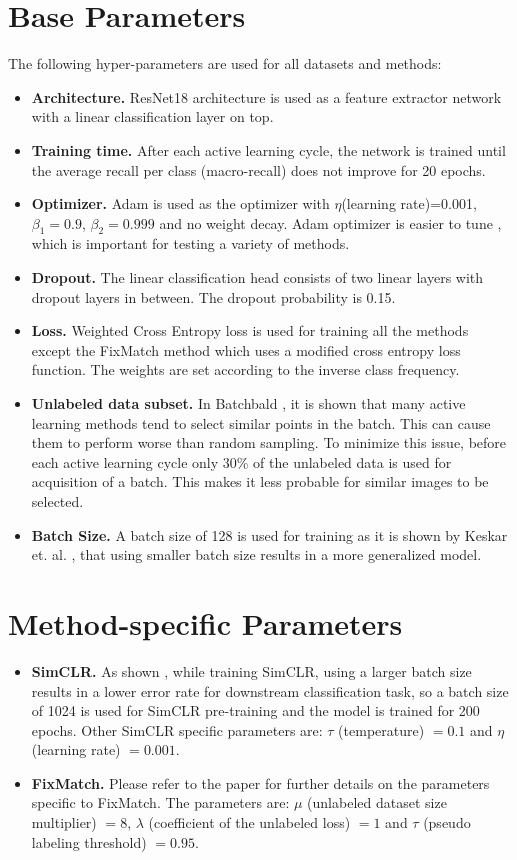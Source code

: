 \section{Base Parameters}\label{section:base_parameters}
The following hyper-parameters are used for all datasets and methods:
\begin{itemize}
  \item \textbf{Architecture.} ResNet18 \cite{he2016} architecture is used as a feature extractor network with a linear classification layer on top.
  \item \textbf{Training time.} After each active learning cycle, the network is trained until the average recall per class (macro-recall) does not improve for 20 epochs.
  \item \textbf{Optimizer.} Adam \cite{kingma2014} is used as the optimizer with $\eta$(learning rate)=0.001, $\beta_1=0.9$, $\beta_2=0.999$ and no weight decay. Adam optimizer is easier to tune \cite{schneider2019}, which is important for testing a variety of methods.
  \item \textbf{Dropout.} The linear classification head consists of two linear layers with dropout layers in between. The dropout probability is 0.15.
  \item \textbf{Loss.} Weighted Cross Entropy loss is used for training all the methods except the FixMatch method which uses a modified cross entropy loss function. The weights are set according to the inverse class frequency.
  \item \textbf{Unlabeled data subset.} In Batchbald \cite{kirsch2019}, it is shown that many active learning methods tend to select similar points in the batch. This can cause them to perform worse than random sampling. To minimize this issue, before each active learning cycle only 30\% of the unlabeled data is used for acquisition of a batch. This makes it less probable for similar images to be selected.
  \item \textbf{Batch Size.} A batch size of 128 is used for training as it is shown by Keskar et. al. \cite{keskar2016}, that using smaller batch size results in a more generalized model.
\end{itemize}
\section{Method-specific Parameters}\label{section:method_specific_parameters}
\begin{itemize}
  \item \textbf{SimCLR.} As shown \cite{chen2020}, while training SimCLR, using a larger batch size results in a lower error rate for downstream classification task, so a batch size of 1024 is used for SimCLR pre-training and the model is trained for 200 epochs. Other SimCLR specific parameters are: $\tau$ (temperature) $= 0.1$ and $\eta$ (learning rate) $= 0.001$.
  \item \textbf{FixMatch.} Please refer to the paper for further details on the parameters specific to FixMatch. The parameters are: $\mu$ (unlabeled dataset size multiplier) $=8$, $\lambda$ (coefficient of the unlabeled loss) $=1$ and $\tau$ (pseudo labeling threshold) $=0.95$.
\end{itemize}
